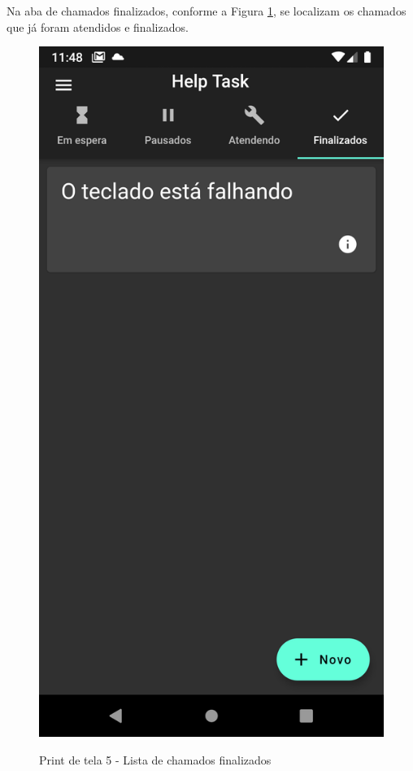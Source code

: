 Na aba de chamados finalizados, conforme a Figura \ref{fig:5_finalizado}, se localizam os chamados que já foram atendidos e finalizados.
\begin{figure}[htb]
     \caption{Print de tela 5 - Lista de chamados finalizados}
     \centering
     \begin{frame}{
     \includegraphics [scale = 0.2]{img/screenshots/5_finalizado.png}}
     \end{frame}
     \label{fig:5_finalizado}
 \end{figure}
\newpage

